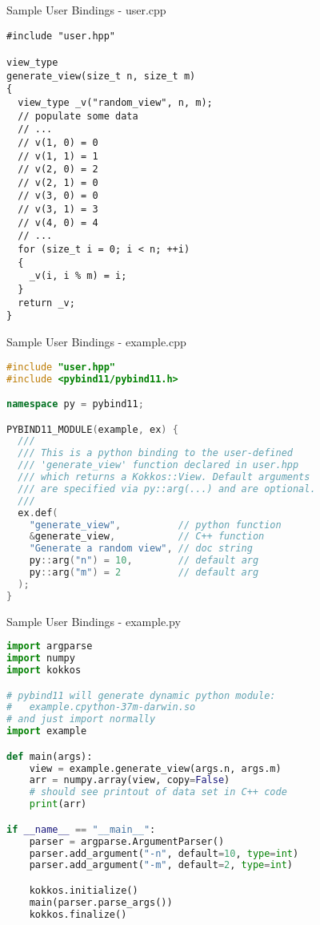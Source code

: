 \begin{frame}[fragile]{Sample User Bindings - user.cpp}
\begin{lstlisting}
#include "user.hpp"

view_type 
generate_view(size_t n, size_t m) 
{
  view_type _v("random_view", n, m);
  // populate some data
  // ...
  // v(1, 0) = 0
  // v(1, 1) = 1
  // v(2, 0) = 2
  // v(2, 1) = 0
  // v(3, 0) = 0
  // v(3, 1) = 3
  // v(4, 0) = 4
  // ...
  for (size_t i = 0; i < n; ++i) 
  {
    _v(i, i % m) = i;
  }
  return _v;
}
\end{lstlisting}
\end{frame}

\begin{frame}[fragile]{Sample User Bindings - example.cpp}
\begin{lstlisting}[language=C++,showstringspaces=false]
#include "user.hpp"
#include <pybind11/pybind11.h>

namespace py = pybind11;

PYBIND11_MODULE(example, ex) {
  ///
  /// This is a python binding to the user-defined
  /// 'generate_view' function declared in user.hpp
  /// which returns a Kokkos::View. Default arguments
  /// are specified via py::arg(...) and are optional.
  ///
  ex.def(
    "generate_view",          // python function
    &generate_view,           // C++ function
    "Generate a random view", // doc string
    py::arg("n") = 10,        // default arg
    py::arg("m") = 2          // default arg
  );
}
\end{lstlisting}
\end{frame}

\begin{frame}[fragile]{Sample User Bindings - example.py}
\begin{lstlisting}[language=python]
import argparse
import numpy
import kokkos

# pybind11 will generate dynamic python module:
#   example.cpython-37m-darwin.so
# and just import normally
import example

def main(args):
    view = example.generate_view(args.n, args.m)
    arr = numpy.array(view, copy=False)
    # should see printout of data set in C++ code
    print(arr)

if __name__ == "__main__":
    parser = argparse.ArgumentParser()
    parser.add_argument("-n", default=10, type=int)
    parser.add_argument("-m", default=2, type=int)

    kokkos.initialize()
    main(parser.parse_args())
    kokkos.finalize()
\end{lstlisting}
\end{frame}

